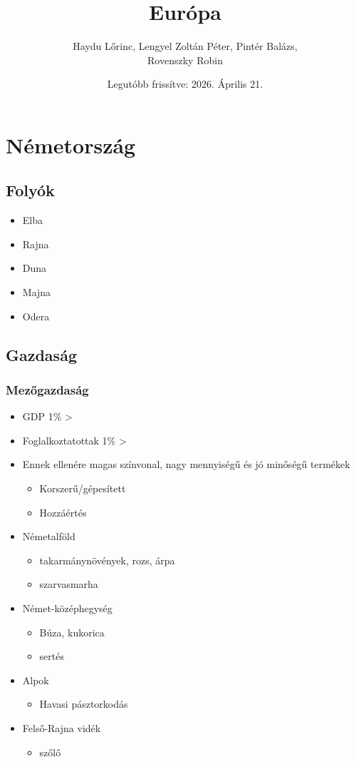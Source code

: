 \documentclass{article}
\title{Európa}
\author{Haydu Lőrinc, Lengyel Zoltán Péter, Pintér Balázs,\\ Rovenszky Robin}
\date{Legutóbb frissítve: 2026. Április 21.}
\begin{document}
\maketitle
\tableofcontents
\newpage

\section{Németország}

\subsection{Folyók}
\begin{itemize}
    \item Elba
    \item Rajna
    \item Duna
    \item Majna
    \item Odera
\end{itemize}

\subsection{Gazdaság}

\subsubsection{Mezőgazdaság}
\begin{itemize}
    \item GDP 1\% >
    \item Foglalkoztatottak 1\% >
    \item Ennek ellenére magas színvonal, nagy mennyiségű és jó minőségű termékek
    \begin{itemize}
        \item Korszerű/gépesített
        \item Hozzáértés
    \end{itemize}
    \item Németalföld \begin{itemize}
        \item takarmánynövények, rozs, árpa
        \item szarvasmarha
    \end{itemize}
    \item Német-középhegység \begin{itemize}
        \item Búza, kukorica
        \item sertés
    \end{itemize}
    \item Alpok \begin{itemize}
        \item Havasi pásztorkodás
    \end{itemize}
    \item Felső-Rajna vidék \begin{itemize}
        \item szőlő
    \end{itemize}
\end{itemize}
\end{document}
